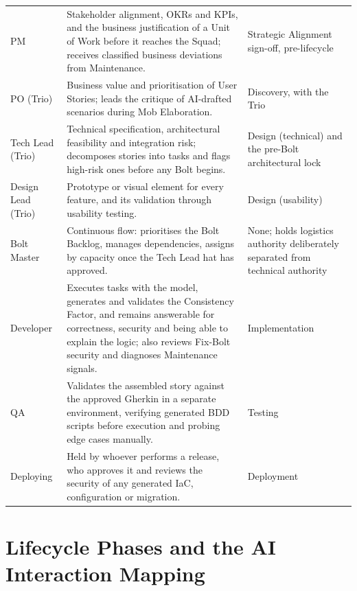{\begin{longtable}{>{\raggedright\arraybackslash}p{2.4cm}
                  >{\raggedright\arraybackslash}p{8.6cm}
                  >{\raggedright\arraybackslash}p{3.6cm}}
\ac{PM} & Stakeholder alignment, \acp{OKR} and \acp{KPI}, and the business justification of a Unit of Work before it reaches the Squad; receives classified business deviations from Maintenance. & Strategic Alignment sign-off, pre-lifecycle \\ \addlinespace
\ac{PO} (Trio) & Business value and prioritisation of User Stories; leads the critique of AI-drafted scenarios during Mob Elaboration. & Discovery, with the Trio \\ \addlinespace
Tech Lead (Trio) & Technical specification, architectural feasibility and integration risk; decomposes stories into tasks and flags high-risk ones before any Bolt begins. & Design (technical) and the pre-Bolt architectural lock \\ \addlinespace
Design Lead (Trio) & Prototype or visual element for every feature, and its validation through usability testing. & Design (usability) \\ \addlinespace
Bolt Master & Continuous flow: prioritises the Bolt Backlog, manages dependencies, assigns by capacity once the Tech Lead hat has approved. & None; holds logistics authority deliberately separated from technical authority \\ \addlinespace
Developer & Executes tasks with the model, generates and validates the Consistency Factor, and remains answerable for correctness, security and being able to explain the logic; also reviews Fix-Bolt security and diagnoses Maintenance signals. & Implementation \\ \addlinespace
\ac{QA} & Validates the assembled story against the approved Gherkin in a separate environment, verifying generated \ac{BDD} scripts before execution and probing edge cases manually. & Testing \\ \addlinespace
Deploying & Held by whoever performs a release, who approves it and reviews the security of any generated \ac{IaC}, configuration or migration. & Deployment \\

\end{longtable}
}

\section{Lifecycle Phases and the AI Interaction Mapping}
\label{sec:phases}


